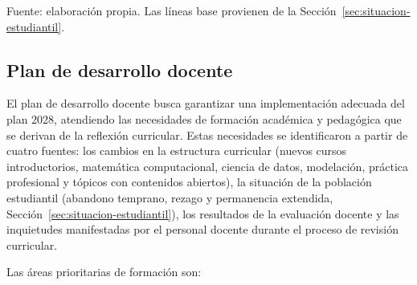 %
\vspace{-0.8\baselineskip}
{\footnotesize Fuente: elaboración propia. Las líneas base provienen de la Sección~\ref{sec:situacion-estudiantil}.\par}
\endgroup
\medskip

\subsection{Plan de desarrollo docente}
\label{sec:desarrollo-docente}

El plan de desarrollo docente busca garantizar una implementación adecuada del plan 2028, atendiendo las necesidades de formación académica y pedagógica que se derivan de la reflexión curricular. Estas necesidades se identificaron a partir de cuatro fuentes: los cambios en la estructura curricular (nuevos cursos introductorios, matemática computacional, ciencia de datos, modelación, práctica profesional y tópicos con contenidos abiertos), la situación de la población estudiantil (abandono temprano, rezago y permanencia extendida, Sección~\ref{sec:situacion-estudiantil}), los resultados de la evaluación docente y las inquietudes manifestadas por el personal docente durante el proceso de revisión curricular.

Las áreas prioritarias de formación son:

